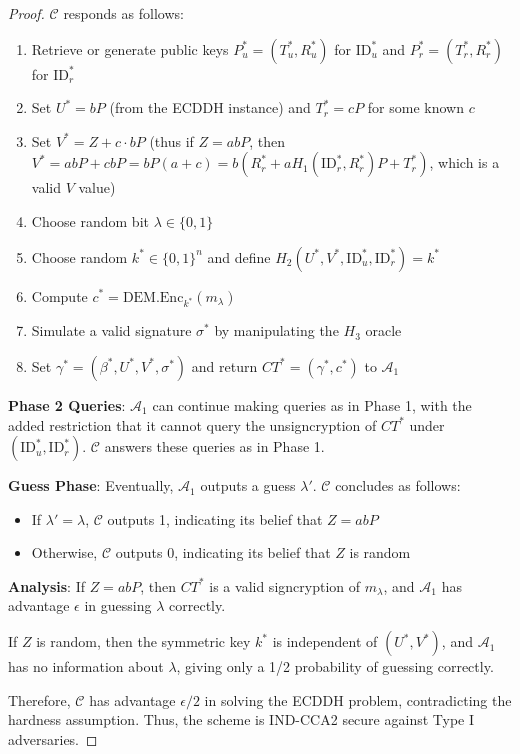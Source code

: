 \documentclass[10pt]{article}
\newtheorem{proof}{Proof}
\begin{document}
\begin{proof}
$\mathcal{C}$ responds as follows:
\begin{enumerate}
    \item Retrieve or generate public keys $P_u^* = (T_u^*, R_u^*)$ for $\text{ID}_u^*$ and $P_r^* = (T_r^*, R_r^*)$ for $\text{ID}_r^*$
    \item Set $U^* = bP$ (from the ECDDH instance) and $T_r^* = cP$ for some known $c$
    \item Set $V^* = Z + c \cdot bP$ (thus if $Z = abP$, then $V^* = abP + cbP = bP(a + c) = b(R_r^* + aH_1(\text{ID}_r^*, R_r^*)P + T_r^*)$, which is a valid $V$ value)
    \item Choose random bit $\lambda \in \{0, 1\}$
    \item Choose random $k^* \in \{0,1\}^n$ and define $H_2(U^*, V^*, \text{ID}_u^*, \text{ID}_r^*) = k^*$
    \item Compute $c^* = \text{DEM.Enc}_{k^*}(m_\lambda)$
    \item Simulate a valid signature $\sigma^*$ by manipulating the $H_3$ oracle
    \item Set $\gamma^* = (\beta^*, U^*, V^*, \sigma^*)$ and return $CT^* = (\gamma^*, c^*)$ to $\mathcal{A}_1$
\end{enumerate}

\textbf{Phase 2 Queries}:
$\mathcal{A}_1$ can continue making queries as in Phase 1, with the added restriction that it cannot query the unsigncryption of $CT^*$ under $(\text{ID}_u^*, \text{ID}_r^*)$. $\mathcal{C}$ answers these queries as in Phase 1.

\textbf{Guess Phase}:
Eventually, $\mathcal{A}_1$ outputs a guess $\lambda'$. $\mathcal{C}$ concludes as follows:
\begin{itemize}
    \item If $\lambda' = \lambda$, $\mathcal{C}$ outputs 1, indicating its belief that $Z = abP$
    \item Otherwise, $\mathcal{C}$ outputs 0, indicating its belief that $Z$ is random
\end{itemize}

\textbf{Analysis}:
If $Z = abP$, then $CT^*$ is a valid signcryption of $m_\lambda$, and $\mathcal{A}_1$ has advantage $\epsilon$ in guessing $\lambda$ correctly.

If $Z$ is random, then the symmetric key $k^*$ is independent of $(U^*, V^*)$, and $\mathcal{A}_1$ has no information about $\lambda$, giving only a 1/2 probability of guessing correctly.

Therefore, $\mathcal{C}$ has advantage $\epsilon/2$ in solving the ECDDH problem, contradicting the hardness assumption. Thus, the scheme is IND-CCA2 secure against Type I adversaries.
\end{proof}
\end{document}
